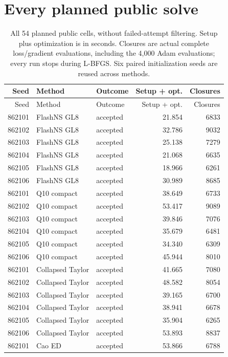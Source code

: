 \documentclass[11pt]{article}
\begin{document}
\section{Every planned public solve}
\small\setlength{\tabcolsep}{4pt}
\begin{longtable}{rllrr}
\caption{All 54 planned public cells, without failed-attempt filtering. Setup plus optimization is in seconds. Closures are actual complete loss/gradient evaluations, including the 4,000 Adam evaluations; every run stops during L-BFGS. Six paired initialization seeds are reused across methods.}\\
\toprule Seed & Method & Outcome & Setup + opt. & Closures\\\midrule\endfirsthead
\toprule Seed & Method & Outcome & Setup + opt. & Closures\\\midrule\endhead
862101 & FlashNS GL8 & accepted & 21.854 & 6833\\
862102 & FlashNS GL8 & accepted & 32.786 & 9032\\
862103 & FlashNS GL8 & accepted & 25.138 & 7279\\
862104 & FlashNS GL8 & accepted & 21.068 & 6635\\
862105 & FlashNS GL8 & accepted & 18.966 & 6261\\
862106 & FlashNS GL8 & accepted & 30.989 & 8685\\
862101 & Q10 compact & accepted & 38.649 & 6733\\
862102 & Q10 compact & accepted & 53.417 & 9089\\
862103 & Q10 compact & accepted & 39.846 & 7076\\
862104 & Q10 compact & accepted & 35.679 & 6481\\
862105 & Q10 compact & accepted & 34.340 & 6309\\
862106 & Q10 compact & accepted & 45.944 & 8010\\
862101 & Collapsed Taylor & accepted & 41.665 & 7080\\
862102 & Collapsed Taylor & accepted & 48.582 & 8054\\
862103 & Collapsed Taylor & accepted & 39.165 & 6700\\
862104 & Collapsed Taylor & accepted & 38.941 & 6678\\
862105 & Collapsed Taylor & accepted & 35.904 & 6265\\
862106 & Collapsed Taylor & accepted & 53.893 & 8837\\
862101 & Cao ED & accepted & 53.866 & 6788\\

\end{longtable}
\end{document}
